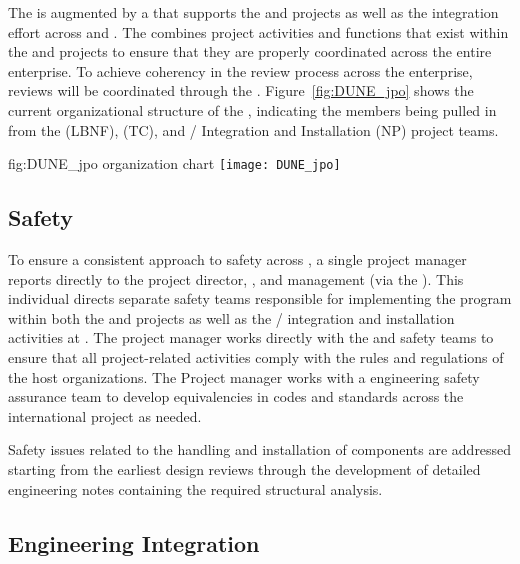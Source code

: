 The  is augmented by a  that supports the
 and  projects as well as the integration
effort across  and . The  
combines project activities and functions that exist within the 
 and  projects to ensure that they are 
properly coordinated across the entire enterprise.    
To achieve coherency in the review process across the 
 enterprise, reviews will be coordinated 
through the . 
Figure~\ref{fig:DUNE_jpo} shows the current organizational 
structure of the , indicating the members being 
pulled in from the  (LBNF),  (TC), and 
/ Integration and Installation (NP) 
project teams.

\begin{dunefigure}{fig:DUNE_jpo}
  { organization chart}
  \texttt{[image: DUNE\_jpo]}
\end{dunefigure}


\subsection{Safety}
\label{sec:dune_safety}

To ensure a consistent approach to safety across ,
a single project  manager reports directly 
to the  project director, , and 
management (via the  ).  This individual
directs separate safety teams responsible for implementing the 
  program within both the  
and  projects as well as the /
integration and installation activities at .  The 
project  manager works directly with the  
and  safety teams to ensure that all project-related 
activities comply with the rules and regulations of the host 
organizations.  The Project  manager works with a  
engineering safety assurance team to develop
equivalencies in codes and standards across the international project
as needed.

Safety issues related to the handling 
and installation of components are addressed starting 
from the earliest design reviews through the development 
of detailed engineering notes containing the required
structural analysis.


\subsection{Engineering Integration}
\label{sec:dune_engineering}

